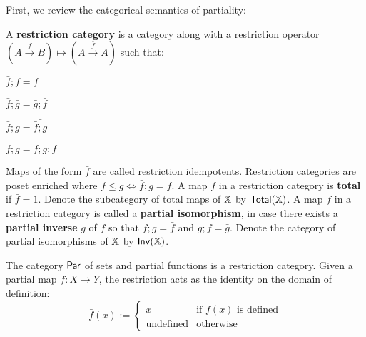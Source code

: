 First, we review the categorical semantics of partiality:
\label{sec:rest}
\begin{definition}\cite[\S 2.1.1]{cockett}
A {\bf restriction category} is a category along with a restriction operator 
$
(A \xrightarrow{f} B )\mapsto (A \xrightarrow{\bar f} A)
$
such that:



\hfil
\begin{minipage}{15cm}
\begin{multicols}{4}
\begin{enumerate}[label={\bf [R.\arabic*]}, ref={\bf [R.\arabic*]}]
\item $\bar f ; f  = f$
\label{R.1}
\item $\bar f ; \bar g = \bar g ; \bar f$
\label{R.2}
\item $\bar f ; \bar g = \bar{\bar f ;  g}$
\label{R.3}
\item $f ; \bar g = \bar{f; g} ; f$
\label{R.4}
\end{enumerate}
\end{multicols}
\end{minipage}

Maps of the form $\bar f$ are called restriction idempotents.
Restriction categories are poset enriched where $f \leq g \iff \bar f ; g = f$.
A map $f$ in a restriction category is {\bf total} if $\bar f =1$.  Denote the subcategory of total maps of $\mathbb{X}$ by $\mathsf{Total}(\mathbb{X})$.
A map $f$ in a restriction category is called a {\bf partial isomorphism}, in case there exists a {\bf partial inverse} $g$ of $f$ so that $f;g=\bar f$ and $g;f = \bar g$. Denote the category of partial isomorphisms of $\mathbb{X}$ by $\mathsf{Inv}(\mathbb{X})$.
\end{definition}
\begin{example}
The category $\mathsf{Par}$ of sets and partial functions is a restriction category.   Given a partial map $f:X\to Y$, the restriction acts as the identity on the domain of definition:
$$
\bar f (x):=
\begin{cases}
x & \text{if }f(x)\text{ is defined}\\
\text{undefined} & \text{otherwise}
\end{cases}
$$
\end{example}
%
%
